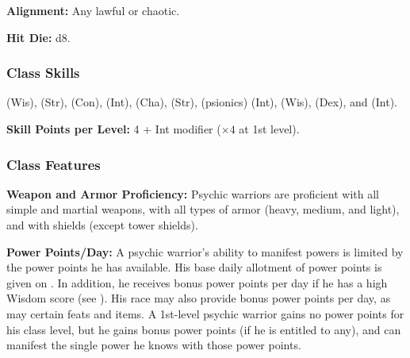 \textbf{Alignment:} Any lawful or chaotic.

\textbf{Hit Die:} d8.

\subsubsection{Class Skills}
 (Wis),  (Str),  (Con),  (Int),  (Cha),  (Str),  (psionics) (Int),  (Wis),  (Dex), and  (Int).

\textbf{Skill Points per Level:} 4 + Int modifier ($\times 4$ at 1st level).

\subsubsection{Class Features}

\textbf{Weapon and Armor Proficiency:} Psychic warriors are proficient with all simple and martial weapons, with all types of armor (heavy, medium, and light), and with shields (except tower shields).

\textbf{Power Points/Day:} A psychic warrior's ability to manifest powers is limited by the power points he has available. His base daily allotment of power points is given on . In addition, he receives bonus power points per day if he has a high Wisdom score (see ). His race may also provide bonus power points per day, as may certain feats and items. A 1st-level psychic warrior gains no power points for his class level, but he gains bonus power points (if he is entitled to any), and can manifest the single power he knows with those power points.

